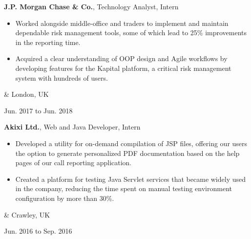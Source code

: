 \documentclass[10pt, letterpaper]{article}
\newenvironment{highlights}{
        \begin{itemize}[
                topsep=0pt,
                parsep=0.1 cm,
                partopsep=0pt,
                itemsep=0pt,
                after=\vspace{-1\baselineskip},
                leftmargin=0.7 cm + 3pt
            ]
    }{
        \end{itemize}
    } %
\let\originalTabularx\tabularx
\let\originalEndTabularx\endtabularx
\renewenvironment{tabularx}{\bgroup\centering\originalTabularx}{\originalEndTabularx\par\egroup}
\begin{document}
        \vspace{0.2 cm}
        \begin{tabularx}{
            \textwidth-0.2 cm-0.13cm
        }{
            K{0.1 cm}
            R{4.1 cm}
        }
            \textbf{J.P. Morgan Chase \& Co.}, Technology Analyst, Intern

            \vspace{0.1 cm}

            \begin{highlights}
                \item Worked alongside middle-office and traders to implement and maintain dependable risk management tools, some of which lead to 25\% improvements in the reporting time.
                \item Acquired a clear understanding of OOP design and Agile workflows by developing features for the Kapital platform, a critical risk management system with hundreds of users.
            \end{highlights}
            &
            London, UK

            Jun. 2017 to Jun. 2018
        \end{tabularx}

        \vspace{0.2 cm}
        \begin{tabularx}{
            \textwidth-0.2 cm-0.13cm
        }{
            K{0.1 cm}
            R{4.1 cm}
        }
            \textbf{Akixi Ltd.}, Web and Java Developer, Intern

            \vspace{0.1 cm}

            \begin{highlights}
                \item Developed a utility for on-demand compilation of JSP files, offering our users the option to generate personalized PDF documentation based on the help pages of our call reporting application.
                \item Created a platform for testing Java Servlet services that became widely used in the company, reducing the time spent on manual testing environment configuration by more than 30\%.
            \end{highlights}
            &
            Crawley, UK

            Jun. 2016 to Sep. 2016
        \end{tabularx}
\end{document}
